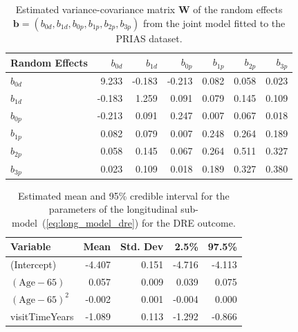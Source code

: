 \begin{table}[!htb]
\begin{center}
\caption{Estimated variance-covariance matrix $\boldsymbol{W}$ of the random effects ${\boldsymbol{b}=(b_{0d},b_{1d},b_{0p}, b_{1p}, b_{2p}, b_{3p})}$ from the joint model fitted to the PRIAS dataset.}
\label{tab:D_matrix}
\begin{tabular}{lrrrrrr}
\hline
\hline
Random Effects    & $b_{0d}$    & $b_{1d}$    & $b_{0p}$    & $b_{1p}$   & $b_{2p}$   & $b_{3p}$ \\
\hline
$b_{0d}$ & 9.233 & -0.183 & -0.213 & 0.082 & 0.058 & 0.023 \\
$b_{1d}$ & -0.183 & 1.259 & 0.091 & 0.079 & 0.145 & 0.109 \\
\hline
$b_{0p}$ & -0.213 & 0.091 & 0.247 & 0.007 & 0.067 & 0.018 \\
$b_{1p}$ & 0.082 & 0.079 & 0.007 & 0.248 & 0.264 & 0.189 \\
$b_{2p}$ & 0.058 & 0.145 & 0.067 & 0.264 & 0.511 & 0.327 \\
$b_{3p}$ & 0.023 & 0.109 & 0.018 & 0.189 & 0.327 & 0.380 \\
\hline
\end{tabular}
\end{center}
\end{table}

\begin{table}[!htb]
\begin{center}
\caption{Estimated mean and 95\% credible interval for the parameters of the longitudinal sub-model~(\ref{eq:long_model_dre}) for the DRE outcome.}
\label{tab:DRE_long}
\begin{tabular}{lrrrr}
\hline
\hline
Variable                         & Mean & Std. Dev & 2.5\%  & 97.5\%   \\
\hline
(Intercept)                      & -4.407 & 0.151 & -4.716 & -4.113 \\
$(\mbox{Age} - 65)$              & 0.057 & 0.009 & 0.039 & 0.075 \\
$(\mbox{Age} - 65)^2$            & -0.002 & 0.001 & -0.004 & 0.000\\
visitTimeYears                   & -1.089 & 0.113 & -1.292 & -0.866 \\
\hline
\end{tabular}
\end{center}
\end{table}

